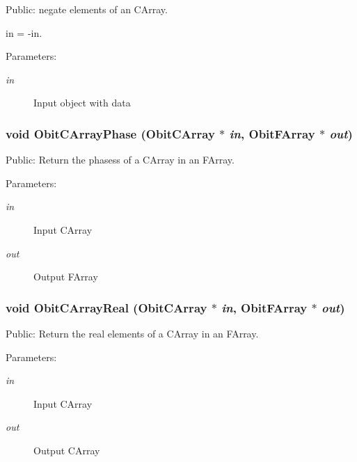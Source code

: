 Public: negate elements of an CArray. 

in = -in. \begin{Desc}
\item[Parameters:]
\begin{description}
\item[{\em in}]Input object with data \end{description}
\end{Desc}
\subsubsection{\setlength{\rightskip}{0pt plus 5cm}void Obit\-CArray\-Phase ({\bf Obit\-CArray} $\ast$ {\em in}, {\bf Obit\-FArray} $\ast$ {\em out})}\label{ObitCArray_8c_a37}


Public: Return the phasess of a CArray in an FArray. 

\begin{Desc}
\item[Parameters:]
\begin{description}
\item[{\em in}]Input CArray \item[{\em out}]Output FArray \end{description}
\end{Desc}
\subsubsection{\setlength{\rightskip}{0pt plus 5cm}void Obit\-CArray\-Real ({\bf Obit\-CArray} $\ast$ {\em in}, {\bf Obit\-FArray} $\ast$ {\em out})}\label{ObitCArray_8c_a34}


Public: Return the real elements of a CArray in an FArray. 

\begin{Desc}
\item[Parameters:]
\begin{description}
\item[{\em in}]Input CArray \item[{\em out}]Output CArray \end{description}
\end{Desc}
